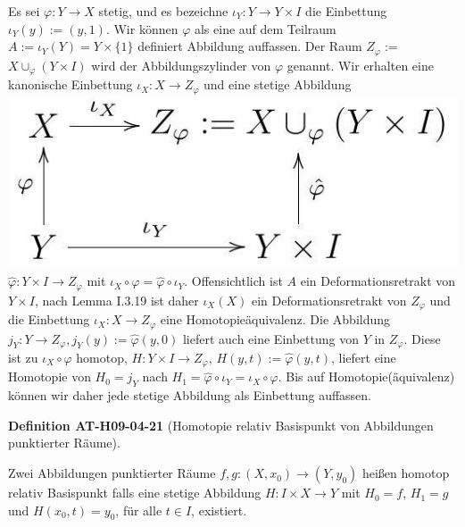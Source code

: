 \documentclass[10pt, letterpaper]{article}
\newcommand{\CustomHeading}[3]{%
  \par\medskip\noindent%
  \textbf{#1 #2} \textnormal{(#3)}.\enskip%
}
\newenvironment{DEF}[2]{\begin{unitbox}\CustomHeading{Definition}{#1}{#2}}{\end{unitbox}}
\begin{document}
Es sei $\varphi: Y \rightarrow X$ stetig, und es bezeichne $\iota_{Y}: Y \rightarrow Y \times I$ die Einbettung $\iota_{Y}(y):=(y, 1)$. Wir können $\varphi$ als eine auf dem Teilraum $A:=\iota_{Y}(Y)=Y \times\{1\}$ definiert Abbildung auffassen. Der Raum $Z_{\varphi}:=$ $X \cup_{\varphi}(Y \times I)$ wird der Abbildungszylinder von $\varphi$ genannt. Wir erhalten eine kanonische Einbettung $\iota_{X}: X \rightarrow Z_{\varphi}$ und eine stetige Abbildung\\
\includegraphics[max width=\textwidth]{2025_06_05_d7ed2bacd1e9ce1db1f0g-028} $\hat{\varphi}: Y \times I \rightarrow Z_{\varphi}$ mit $\iota_{X} \circ \varphi=\hat{\varphi} \circ \iota_{Y}$. Offensichtlich ist $A$ ein Deformationsretrakt von $Y \times I$, nach Lemma I.3.19 ist daher $\iota_{X}(X)$ ein Deformationsretrakt von $Z_{\varphi}$ und die Einbettung $\iota_{X}: X \rightarrow Z_{\varphi}$ eine Homotopieäquivalenz. Die Abbildung $j_{Y}: Y \rightarrow Z_{\varphi}, j_{Y}(y):=\hat{\varphi}(y, 0)$ liefert auch eine Einbettung von $Y$ in $Z_{\varphi}$. Diese ist zu $\iota_{X} \circ \varphi$ homotop, $H: Y \times I \rightarrow Z_{\varphi}$, $H(y, t):=\hat{\varphi}(y, t)$, liefert eine Homotopie von $H_{0}=j_{Y}$ nach $H_{1}=\hat{\varphi} \circ \iota_{Y}=\iota_{X} \circ \varphi$. Bis auf Homotopie(äquivalenz) können wir daher jede stetige Abbildung als Einbettung auffassen.




\begin{DEF}{AT-H09-04-21}{Homotopie relativ Basispunkt von Abbildungen punktierter Räume}
Zwei Abbildungen punktierter Räume $f, g:\left(X, x_{0}\right) \rightarrow\left(Y, y_{0}\right)$ heißen homotop relativ Basispunkt falls eine stetige Abbildung $H: I \times X \rightarrow Y$ mit $H_{0}=f$, $H_{1}=g$ und $H\left(x_{0}, t\right)=y_{0}$, für alle $t \in I$, existiert.
\end{DEF}
\end{document}
